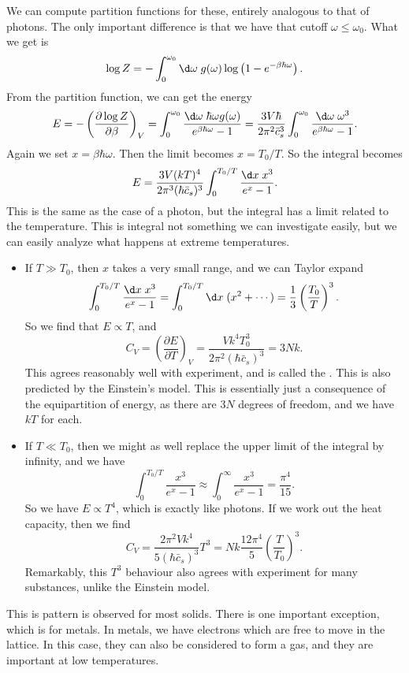 \documentclass[a4paper]{article}
\begin{document}
We can compute partition functions for these, entirely analogous to that of photons. The only important difference is that we have that cutoff $\omega \leq \omega_0$. What we get is
\[
  \log Z = - \int_0^{\omega_0} \d \omega \; g(\omega) \log\left(1 - e^{-\beta \hbar \omega}\right).
\]
From the partition function, we can get the energy
\[
  E = -\left(\frac{\partial \log Z}{\partial \beta}\right)_V = \int_0^{\omega_0} \frac{\d \omega\; \hbar \omega g(\omega)}{e^{\beta \hbar \omega} - 1} = \frac{3V \hbar}{2\pi^2 \bar{c}_s^3} \int_0^{\omega_0} \frac{\d \omega\; \omega^3}{e^{\beta \hbar \omega} - 1}.
\]
Again we set $x = \beta \hbar \omega$. Then the limit becomes $x = T_0/T$. So the integral becomes
\[
  E = \frac{3V (kT)^4}{2\pi^3 (\hbar \bar{c}_s)^3} \int_0^{T_0/T} \frac{\d x\; x^3}{e^x - 1}.
\]
This is the same as the case of a photon, but the integral has a limit related to the temperature. This is integral not something we can investigate easily, but we can easily analyze what happens at extreme temperatures.
\begin{itemize}
  \item If $T \gg T_0$, then $x$ takes a very small range, and we can Taylor expand
    \[
      \int_0^{T_0/T}\frac{\d x\; x^3}{e^x - 1}= \int_0^{T_0/T} \d x\; (x^2 + \cdots) = \frac{1}{3} \left(\frac{T_0}{T}\right)^3.
    \]
    So we find that $E \propto T$, and
    \[
      C_V = \left(\frac{\partial E}{\partial T}\right)_V = \frac{V k^4 T_0^3}{2\pi^2(\hbar \bar{c}_s)^3} = 3 Nk.
    \]
    This agrees reasonably well with experiment, and is called the .
    This is also predicted by the Einstein's model. This is essentially just a consequence of the equipartition of energy, as there are $3N$ degrees of freedom, and we have $kT$ for each.
  \item If $T \ll T_0$, then we might as well replace the upper limit of the integral by infinity, and we have
    \[
      \int_0^{T_0/T} \frac{x^3}{e^x - 1} \approx \int_0^\infty \frac{x^3}{e^x - 1} = \frac{\pi^4}{15}.
    \]
    So we have $E \propto T^4$, which is exactly like photons. If we work out the heat capacity, then we find
    \[
      C_V = \frac{2\pi^2 V k^4}{5(\hbar \bar{c}_s)^3} T^3 = Nk \frac{12 \pi^4}{5}\left(\frac{T}{T_0}\right)^3.
    \]
    Remarkably, this $T^3$ behaviour also agrees with experiment for many substances, unlike the Einstein model.
\end{itemize}
This is pattern is observed for most solids. There is one important exception, which is for metals. In metals, we have electrons which are free to move in the lattice. In this case, they can also be considered to form a gas, and they are important at low temperatures.
\end{document}
